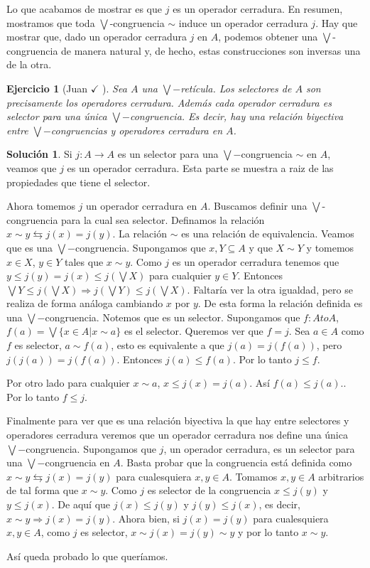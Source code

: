\documentclass[12pt,letterpaper,titlepage]{article}
\newtheorem{exe}{Ejercicio}
\theoremstyle{definition}
\newtheorem*{sol}{Solución}
\newcommand\Sup{\bigvee}
\newcommand\simr{{\sim}}
\newcommand\<{\langle}
\renewcommand\>{\rangle}
\begin{document}
Lo que acabamos de mostrar es que $j$ es un operador cerradura.
En resumen, mostramos que toda $\Sup$-congruencia $\simr$ induce
un operador cerradura $j$.
Hay que mostrar que, dado un operador cerradura $j$ en $A$, podemos obtener una
$\Sup$-congruencia de manera natural y, de hecho, estas construcciones son
inversas una de la otra.
\begin{exe}[Juan $\checkmark$ ]
    Sea $A$ una $\Sup-$retícula. Los selectores de $A$ son precisamente los operadores cerradura. Además cada operador cerradura es selector para una única $\Sup-$congruencia. Es decir, hay una relación biyectiva entre $\Sup-$congruencias y operadores cerradura en $A$.
\end{exe}

\begin{sol}
    Si $j:A\to A$ es un selector para una $\Sup-$congruencia $\simr$ en $A$, veamos que $j$ es un operador cerradura. Esta parte se muestra a raiz de las propiedades que tiene el selector.
    
    Ahora tomemos $j$ un operador cerradura en $A$. Buscamos definir una $\Sup$-congruencia para la cual sea selector. Definamos la relación $x\simr y\leftrightarrows j(x)=j(y)$. La relación $\simr$ es una relación de equivalencia. Veamos que es una $\Sup-$congruencia. Supongamos que $x,Y\subseteq A$ y que $X\simr Y$ y tomemos $x\in X$, $y\in Y$ tales que $x\simr y$. Como $j$ es un operador cerradura tenemos que $y\leq j(y)=j(x)\leq j(\Sup X)$ para cualquier $y\in Y$. Entonces $\Sup Y\leq j(\Sup X)\Rightarrow j(\Sup Y)\leq j(\Sup X)$. Faltaría ver la otra igualdad, pero se realiza de forma análoga cambiando $x$ por $y$. De esta forma la relación definida es una $\Sup-$congruencia. Notemos que es un selector. Supongamos que $f:Ato A$, $f(a)=\Sup\{x\in A|x\simr a\}$ es el selector. Queremos ver que $f=j$. Sea $a\in A$ como $f$ es selector, $a\simr f(a)$, esto es equivalente a que $j(a)=j(f(a))$, pero $j(j(a))=j(f(a))$. Entonces $j(a)\leq f(a)$. Por lo tanto $j\leq f$.
    
    Por otro lado para cualquier $x\simr a$, $x\leq j(x)=j(a)$. Así $f(a)\leq j(a)$.. Por lo tanto $f\leq j$.
    
    Finalmente para ver que es una relación biyectiva la que hay entre selectores y operadores cerradura veremos que un operador cerradura nos define una única $\Sup-$congruencia. Supongamos que $j$, un operador cerradura, es un selector para una $\Sup-$congruencia en $A$. Basta probar que la congruencia está definida como $x\simr y\leftrightarrows j(x)=j(y)$ para cualesquiera $x,y\in A$. Tomamos $x,y\in A$ arbitrarios de tal forma que $x\simr y$. Como $j$ es selector de la congruencia $x\leq j(y)$ y $y\leq j(x)$. De aquí que $j(x)\leq j(y)$ y $j(y)\leq j(x)$, es decir, $x\simr y\Rightarrow j(x)=j(y)$. Ahora bien, si $j(x)=j(y)$ para cualesquiera $x, y\in A$, como $j$ es selector, $x\simr j(x)=j(y)\simr y$ y por lo tanto $x\simr y$.
    
    Así queda probado lo que queríamos.
    
\end{sol}
\end{document}
